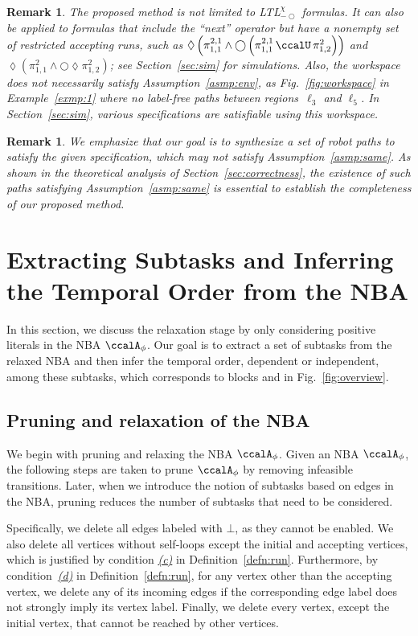 \documentclass[Afour,sageh,times]{sagej}
\newcommand*\circled[1]{\tikz[baseline=(char.base)]{
            \node[shape=circle,draw,inner sep=1pt] (char) {#1};}}
\newtheorem{rem}[thm]{Remark}
\newcommand{\autop}{\ccalA_{\phi}}
\renewcommand{\ap}[3]{\mathcal{\pi}_{{#1},{#2}}^{#3}}
\newcommand{\node}[1]{V_{n}^{\text{#1}}}
\begin{document}
{\begin{rem}
The proposed method is not limited to  LTL$_{-\bigcirc}^\chi$ formulas. It can also be applied to  formulas that include the ``next'' operator but have a nonempty set of restricted accepting runs, such as $\lozenge\left(\ap{1}{1}{2,1} \wedge \bigcirc \left(\ap{1}{1}{2,1} \,\ccalU\, \ap{1}{2}{2}\right)\right)$ and $\lozenge \left(\ap{1}{1}{2}  \wedge \bigcirc \lozenge \ap{1}{2}{2}\right)$; see Section~\ref{sec:sim} for simulations. Also, the workspace does not necessarily satisfy Assumption~\ref{asmp:env}, as Fig.~\ref{fig:workspace} in Example~\ref{exmp:1} where no label-free paths between regions~$\ell_3$ and $\ell_5$. In Section~\ref{sec:sim}, various specifications are satisfiable using this workspace.
\end{rem}

\begin{rem}
We emphasize that our goal is to synthesize a set of robot paths to satisfy the given specification, which may not satisfy Assumption~\ref{asmp:same}. As shown in the theoretical analysis of Section~\ref{sec:correctness}, the existence of such paths satisfying Assumption~\ref{asmp:same} is essential to establish the completeness of our proposed method.
\end{rem}

\section{Extracting Subtasks and Inferring the Temporal Order from the NBA}\label{sec:app}
In this section, we discuss the relaxation stage by only considering positive literals in the NBA $\autop$. Our goal is to extract a set of subtasks from the relaxed NBA  and then infer the temporal order, dependent or independent, among these subtasks, which corresponds to blocks \circled{1} and \circled{2}
in Fig.~\ref{fig:overview}.
\subsection{{Pruning and relaxation of the NBA}}\label{sec:prune}

We begin with pruning and relaxing the NBA $\autop$. Given an NBA $\autop$, the following steps are taken to prune $\autop$ by removing infeasible transitions.  Later, when we introduce the notion of subtasks based on edges in the NBA, pruning reduces the number of subtasks that need to be considered.

Specifically, we delete all edges labeled with $\bot$, as they cannot be enabled.  We also delete all vertices without self-loops except the initial and accepting vertices, which is justified by condition \hyperref[cond:c]{\it (c)} in Definition~\ref{defn:run}. Furthermore, by condition~\hyperref[cond:d]{\it (d)}  in Definition~\ref{defn:run}, for any vertex other than the accepting vertex, we delete any of its incoming edges if the corresponding edge label does not strongly imply its vertex label. Finally, we delete every vertex, except the initial vertex, that cannot be reached by other vertices.

}
\end{document}
